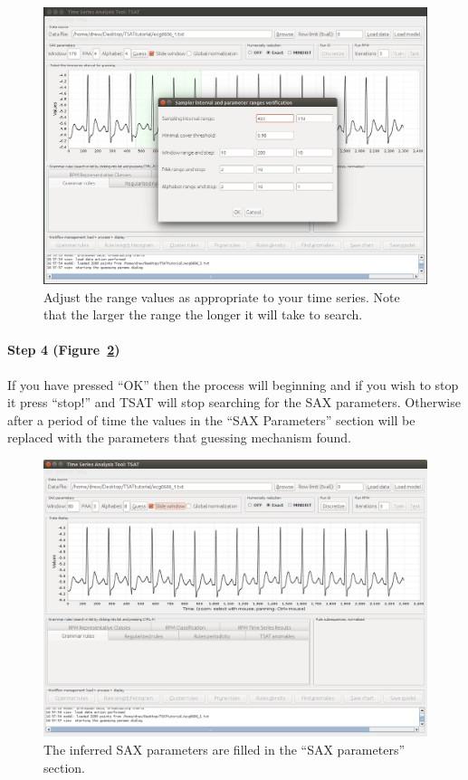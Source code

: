 \documentclass[letterpaper, 12pt]{article}
\begin{document}
\begin{figure}[H]
	\centering
	\includegraphics[width=\textwidth]{pictures/motifguide/step2-setrange}
	\caption{Adjust the range values as appropriate to your time series.  Note that the larger the range the longer it will take to search. }
	\label{fig:step2-setrange}
\end{figure}


\paragraph{Step 4 (Figure~\ref{fig:step3-guessresults})} If you  have pressed ``OK'' then the process will beginning and if you wish to stop it press ``stop!'' and TSAT will stop searching for the SAX parameters.  Otherwise after a period of time the values in the ``SAX Parameters'' section will be replaced with the parameters that guessing mechanism found.

\begin{figure}[H]
	\centering
	\includegraphics[width=\textwidth]{pictures/motifguide/step3-guessresults}
	\caption{The inferred SAX parameters are filled in the ``SAX parameters'' section.}
	\label{fig:step3-guessresults}
\end{figure}
\end{document}

